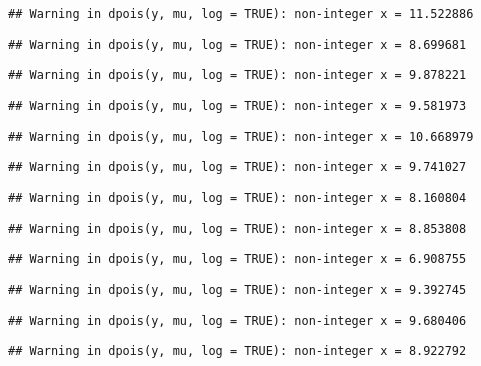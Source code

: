\documentclass[
]{article}
\begin{document}
\begin{verbatim}
## Warning in dpois(y, mu, log = TRUE): non-integer x = 11.522886
\end{verbatim}

\begin{verbatim}
## Warning in dpois(y, mu, log = TRUE): non-integer x = 8.699681
\end{verbatim}

\begin{verbatim}
## Warning in dpois(y, mu, log = TRUE): non-integer x = 9.878221
\end{verbatim}

\begin{verbatim}
## Warning in dpois(y, mu, log = TRUE): non-integer x = 9.581973
\end{verbatim}

\begin{verbatim}
## Warning in dpois(y, mu, log = TRUE): non-integer x = 10.668979
\end{verbatim}

\begin{verbatim}
## Warning in dpois(y, mu, log = TRUE): non-integer x = 9.741027
\end{verbatim}

\begin{verbatim}
## Warning in dpois(y, mu, log = TRUE): non-integer x = 8.160804
\end{verbatim}

\begin{verbatim}
## Warning in dpois(y, mu, log = TRUE): non-integer x = 8.853808
\end{verbatim}

\begin{verbatim}
## Warning in dpois(y, mu, log = TRUE): non-integer x = 6.908755
\end{verbatim}

\begin{verbatim}
## Warning in dpois(y, mu, log = TRUE): non-integer x = 9.392745
\end{verbatim}

\begin{verbatim}
## Warning in dpois(y, mu, log = TRUE): non-integer x = 9.680406
\end{verbatim}

\begin{verbatim}
## Warning in dpois(y, mu, log = TRUE): non-integer x = 8.922792
\end{verbatim}
\end{document}

